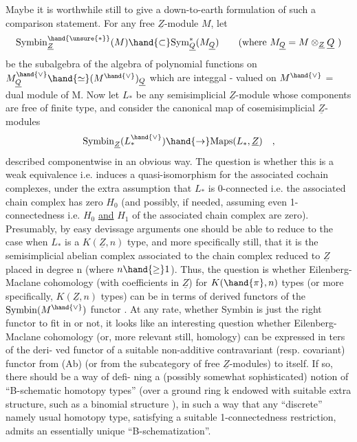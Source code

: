 
Maybe it is worthwhile still to give a down-to-earth formulation of
such a comparison statement. For any free $\underline{Z}$-module $M$, let
\[ \mathrm{Symbin}^{\hand{\unsure{*}}}_{\underline{Z}}(M) \hand{\subset} \mathrm{Sym}^{*}_{\underline{Q}}(M_{\underline{Q}}) \qquad \text{(where } M_{\underline{Q}} = M\otimes_{\underline{Z}}\underline{Q} \text{ )} \]
be the subalgebra of the algebra of polynomial functions on $M_{\underline{Q}}^{\hand{\vee}}\hand{\simeq}(M^{\hand{\vee}})_{\underline{Q}}$
which are integgal - valued on $M^{\hand{\vee}}$ = dual module of M. Now let $L_{*}$
be any semisimplicial $\underline{Z}$-module whose components are free of finite type,
and consider the canonical map of cosemisimplicial $\underline{Z}$-modules
\[ \mathrm{Symbin}_{\underline{Z}}(L_{*}^{\hand{\vee}}) \hand{\to} \mathrm{Maps}(L_{*}, \underline{Z}) \quad , \]
described componentwise in an obvious way. The question is whether this
is a weak equivalence i.e. induces a  quasi-isomorphism for
the associated cochain complexes, under the extra assumption that $L_{*}$ is
0-connected i.e. the associated chain complex has zero $H_{0}$ (and possibly,
if needed, assuming even 1-connectedness i.e. $H_{0}$ \uline{and} $H_{1}$ of the associated
chain complex are  zero). Presumably, by easy devissage arguments one
should be able to reduce to the case when $L_{*}$ is a $K(\underline{Z},n)$ type,  and
more specifically still, that it is the semisimplicial abelian complex
associated to the chain complex reduced to $\underline{Z}$ placed in degree n (where
$n\hand{\geq}1$). Thus, the question is whether Eilenberg-Maclane cohomology (with
coefficients in $\underline{Z}$) for $K(\hand{\pi},n)$ types (or more specifically, $K(\underline{Z},n)$ types)
can be  in terms of derived functors of the $\mathrm{Symbin}(M^{\hand{\vee}})$ functor .
At any rate, whether Symbin is just the right functor to fit in or not,
it looks like an interesting question whether Eilenberg-Maclane cohomology
(or, more relevant still, homology) can be expressed in ters of the deri-%
ved functor of a suitable non-additive contravariant (resp. covariant)
functor from (Ab) (or from the subcategory of free $\underline{Z}$-modules) to itself.
If so, there should be a  way of defi-%
ning a (possibly somewhat sophisticated) notion of ``B-schematic homotopy
types'' (over a ground ring k endowed with suitable extra structure, such
as a binomial structure ),  in such a way that any  ``discrete'' namely
usual homotopy type, satisfying a suitable 1-connectedness restriction,
admits an essentially unique ``B-schematization''.

